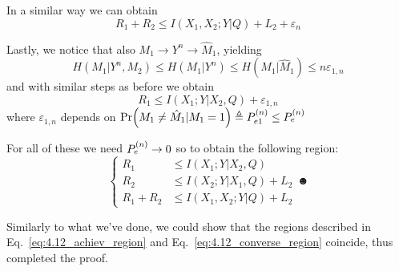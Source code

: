In a similar way we can obtain
%
\begin{equation}
R_1 + R_2 \leq I(X_1,X_2;Y|Q) + L_2 + \varepsilon_n
\end{equation}

Lastly, we notice that also $M_1 \rightarrow Y^n \rightarrow \hat{M}_1$, yielding
%
\begin{equation}
H(M_1|Y^n,M_2) \leq H(M_1|Y^n) \leq H(M_1|\hat{M}_1) \leq n\varepsilon_{1,n}
\end{equation}
%
and with similar steps as before we obtain
%
\begin{equation}
R_1 \leq I(X_1;Y|X_2,Q) + \varepsilon_{1,n}
\end{equation}
%
where $\varepsilon_{1,n}$ depends on $\Pr(M_1 \neq \hat{M}_1|M_1=1) \triangleq P_{e1}^{(n)} \leq  P_e^{(n)} $

For all of these we need $ P_e^{(n)}  \rightarrow 0$ so to obtain the following region:
%
\begin{equation}
\begin{cases}
R_1 &\leq I(X_1;Y|X_2,Q)\\
R_2 &\leq I(X_2;Y|X_1,Q) + L_2\\
R_1+R_2 &\leq I(X_1,X_2;Y|Q) + L_2
\end{cases} \label{eq:4.12_converse_region}☻
\end{equation}

Similarly to what we've done, we could show that the regions described in Eq.~\ref{eq:4.12_achiev_region} and Eq.~\ref{eq:4.12_converse_region} coincide, thus completed the proof.
